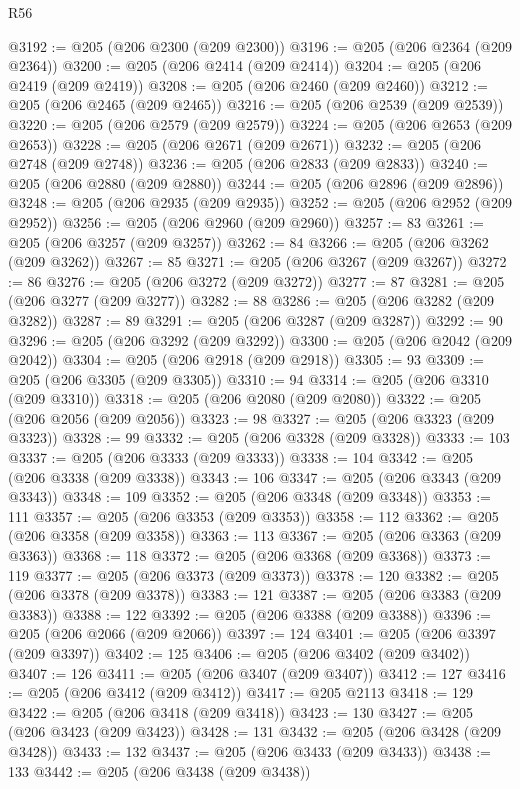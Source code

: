 \begin{lexlean}{R56}
\begin{coremodule}
{{{{{{{{{{{{{{{{{{{{{{{{{{{{{{{{{{{{{{{{{{{{{{{{{{{{{{{{{{{{{{{{{{{{{{{{{{{{{{{{{{{{{{{{{{{{{{{{{{{{{{{{{{{{{{{{{{{{{{{{{{{{{{{{{{{{{{{{{{{{{{{{{{{{{{{{{{{{{{{{{{{{{{{{{{{{{{{{{{{{{{{{{{{{{{{{{{{{{{{{{{{{{{{{{{{@3192 := @205 (@206 @2300 (@209 @2300))
@3196 := @205 (@206 @2364 (@209 @2364))
@3200 := @205 (@206 @2414 (@209 @2414))
@3204 := @205 (@206 @2419 (@209 @2419))
@3208 := @205 (@206 @2460 (@209 @2460))
@3212 := @205 (@206 @2465 (@209 @2465))
@3216 := @205 (@206 @2539 (@209 @2539))
@3220 := @205 (@206 @2579 (@209 @2579))
@3224 := @205 (@206 @2653 (@209 @2653))
@3228 := @205 (@206 @2671 (@209 @2671))
@3232 := @205 (@206 @2748 (@209 @2748))
@3236 := @205 (@206 @2833 (@209 @2833))
@3240 := @205 (@206 @2880 (@209 @2880))
@3244 := @205 (@206 @2896 (@209 @2896))
@3248 := @205 (@206 @2935 (@209 @2935))
@3252 := @205 (@206 @2952 (@209 @2952))
@3256 := @205 (@206 @2960 (@209 @2960))
@3257 := 83
@3261 := @205 (@206 @3257 (@209 @3257))
@3262 := 84
@3266 := @205 (@206 @3262 (@209 @3262))
@3267 := 85
@3271 := @205 (@206 @3267 (@209 @3267))
@3272 := 86
@3276 := @205 (@206 @3272 (@209 @3272))
@3277 := 87
@3281 := @205 (@206 @3277 (@209 @3277))
@3282 := 88
@3286 := @205 (@206 @3282 (@209 @3282))
@3287 := 89
@3291 := @205 (@206 @3287 (@209 @3287))
@3292 := 90
@3296 := @205 (@206 @3292 (@209 @3292))
@3300 := @205 (@206 @2042 (@209 @2042))
@3304 := @205 (@206 @2918 (@209 @2918))
@3305 := 93
@3309 := @205 (@206 @3305 (@209 @3305))
@3310 := 94
@3314 := @205 (@206 @3310 (@209 @3310))
@3318 := @205 (@206 @2080 (@209 @2080))
@3322 := @205 (@206 @2056 (@209 @2056))
@3323 := 98
@3327 := @205 (@206 @3323 (@209 @3323))
@3328 := 99
@3332 := @205 (@206 @3328 (@209 @3328))
@3333 := 103
@3337 := @205 (@206 @3333 (@209 @3333))
@3338 := 104
@3342 := @205 (@206 @3338 (@209 @3338))
@3343 := 106
@3347 := @205 (@206 @3343 (@209 @3343))
@3348 := 109
@3352 := @205 (@206 @3348 (@209 @3348))
@3353 := 111
@3357 := @205 (@206 @3353 (@209 @3353))
@3358 := 112
@3362 := @205 (@206 @3358 (@209 @3358))
@3363 := 113
@3367 := @205 (@206 @3363 (@209 @3363))
@3368 := 118
@3372 := @205 (@206 @3368 (@209 @3368))
@3373 := 119
@3377 := @205 (@206 @3373 (@209 @3373))
@3378 := 120
@3382 := @205 (@206 @3378 (@209 @3378))
@3383 := 121
@3387 := @205 (@206 @3383 (@209 @3383))
@3388 := 122
@3392 := @205 (@206 @3388 (@209 @3388))
@3396 := @205 (@206 @2066 (@209 @2066))
@3397 := 124
@3401 := @205 (@206 @3397 (@209 @3397))
@3402 := 125
@3406 := @205 (@206 @3402 (@209 @3402))
@3407 := 126
@3411 := @205 (@206 @3407 (@209 @3407))
@3412 := 127
@3416 := @205 (@206 @3412 (@209 @3412))
@3417 := @205 @2113
@3418 := 129
@3422 := @205 (@206 @3418 (@209 @3418))
@3423 := 130
@3427 := @205 (@206 @3423 (@209 @3423))
@3428 := 131
@3432 := @205 (@206 @3428 (@209 @3428))
@3433 := 132
@3437 := @205 (@206 @3433 (@209 @3433))
@3438 := 133
@3442 := @205 (@206 @3438 (@209 @3438))
}}}}}}}}}}}}}}}}}}}}}}}}}}}}}}}}}}}}}}}}}}}}}}}}}}}}}}}}}}}}}}}}}}}}}}}}}}}}}}}}}}}}}}}}}}}}}}}}}}}}}}}}}}}}}}}}}}}}}}}}}}}}}}}}}}}}}}}}}}}}}}}}}}}}}}}}}}}}}}}}}}}}}}}}}}}}}}}}}}}}}}}}}}}}}}}}}}}}}}}}}}}}}}}}}}}
\end{coremodule}
\end{lexlean}

